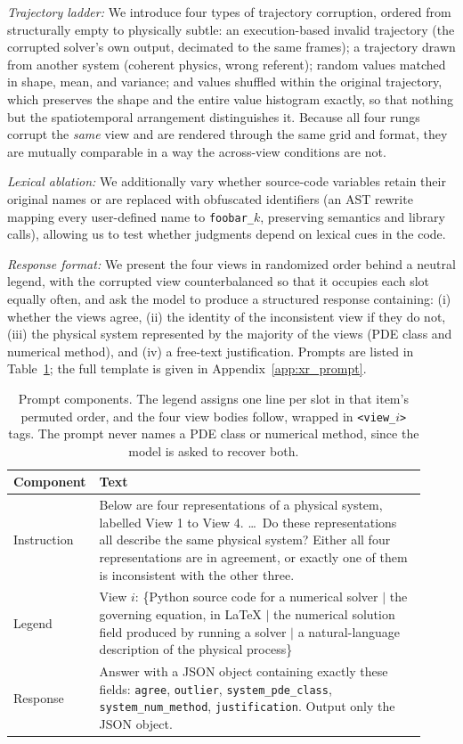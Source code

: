 \emph{Trajectory ladder:} We introduce four types of trajectory corruption, ordered
from structurally empty to physically subtle: an execution-based invalid trajectory
(the corrupted solver's own output, decimated to the same frames); a trajectory
drawn from another system (coherent physics, wrong referent); random values matched
in shape, mean, and variance; and values shuffled within the original trajectory,
which preserves the shape and the entire value histogram exactly, so that nothing
but the spatiotemporal arrangement distinguishes it. Because all four rungs corrupt
the \emph{same} view and are rendered through the same grid and format, they are
mutually comparable in a way the across-view conditions are not.

\emph{Lexical ablation:} We additionally vary whether source-code variables retain
their original names or are replaced with obfuscated identifiers (an AST rewrite
mapping every user-defined name to \texttt{foobar\_$k$}, preserving semantics and
library calls), allowing us to test whether judgments depend on lexical cues in the
code.

\emph{Response format:} We present the four views in randomized order behind a
neutral legend, with the corrupted view counterbalanced so that it occupies each
slot equally often, and ask the model to produce a structured response containing:
(i) whether the views agree, (ii) the identity of the inconsistent view if they do
not, (iii) the physical system represented by the majority of the views (PDE class
and numerical method), and (iv) a free-text justification. Prompts are listed in
Table~\ref{tab:xr_prompt}; the full template is given in
Appendix~\ref{app:xr_prompt}.

\begin{table}[h]
\centering
\small
\begin{tabular}{@{}p{0.14\linewidth}p{0.78\linewidth}@{}}
\toprule
Component & Text \\
\midrule
Instruction & Below are four representations of a physical system, labelled View 1
to View 4. \dots\ Do these representations all describe the same physical system?
Either all four representations are in agreement, or exactly one of them is
inconsistent with the other three. \\
Legend & View $i$: \{Python source code for a numerical solver $\mid$ the governing
equation, in LaTeX $\mid$ the numerical solution field produced by running a solver
$\mid$ a natural-language description of the physical process\} \\
Response & Answer with a JSON object containing exactly these fields:
\texttt{agree}, \texttt{outlier}, \texttt{system\_pde\_class},
\texttt{system\_num\_method}, \texttt{justification}. Output only the JSON object. \\
\bottomrule
\end{tabular}
\caption{Prompt components. The legend assigns one line per slot in that item's
permuted order, and the four view bodies follow, wrapped in \texttt{<view\_$i$>}
tags. The prompt never names a PDE class or numerical method, since the model is
asked to recover both.}
\label{tab:xr_prompt}
\end{table}

